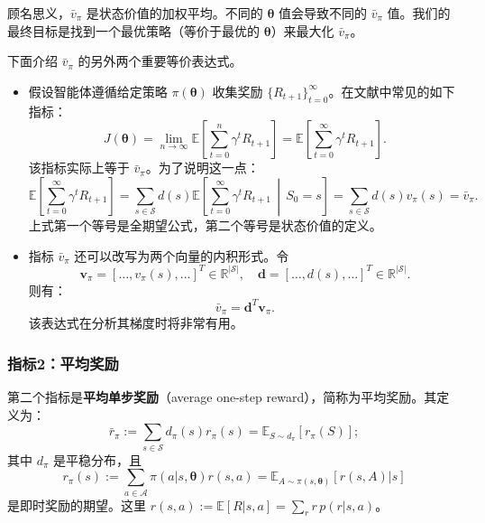 \documentclass[UTF8]{article}
\begin{document}
顾名思义，$\bar{v}_\pi$ 是状态价值的加权平均。不同的 $\boldsymbol{\theta}$ 值会导致不同的 $\bar{v}_\pi$ 值。我们的最终目标是找到一个最优策略（等价于最优的 $\boldsymbol{\theta}$）来最大化 $\bar{v}_\pi$。

下面介绍 $\bar{v}_\pi$ 的另外两个重要等价表达式。

\begin{itemize}
    \item 假设智能体遵循给定策略 $\pi(\boldsymbol{\theta})$ 收集奖励 $\{R_{t+1}\}_{t=0}^{\infty}$。在文献中常见的如下指标：
    \begin{equation}
    J(\boldsymbol{\theta}) = \lim_{n \to \infty} \mathbb{E}\left[ \sum_{t=0}^{n} \gamma^t R_{t+1} \right]
    = \mathbb{E}\left[ \sum_{t=0}^{\infty} \gamma^t R_{t+1} \right]. \label{eq:J_discounted}
    \end{equation}
    该指标实际上等于 $\bar{v}_\pi$。为了说明这一点：
    \[
    \mathbb{E}\left[ \sum_{t=0}^{\infty} \gamma^t R_{t+1} \right]
    = \sum_{s \in \mathcal{S}} d(s) \mathbb{E}\left[ \sum_{t=0}^{\infty} \gamma^t R_{t+1} \,\middle|\, S_0 = s \right]
    = \sum_{s \in \mathcal{S}} d(s) v_\pi(s) = \bar{v}_\pi.
    \]
    上式第一个等号是全期望公式，第二个等号是状态价值的定义。
    \item 指标 $\bar{v}_\pi$ 还可以改写为两个向量的内积形式。令
    \[
    \boldsymbol{v}_\pi = [\dots, v_\pi(s), \dots]^T \in \mathbb{R}^{|\mathcal{S}|}, \quad
    \boldsymbol{d} = [\dots, d(s), \dots]^T \in \mathbb{R}^{|\mathcal{S}|}.
    \]
    则有：
    \[
    \bar{v}_\pi = \boldsymbol{d}^T \boldsymbol{v}_\pi.
    \]
    该表达式在分析其梯度时将非常有用。
\end{itemize}

\subsubsection*{指标2：平均奖励}

第二个指标是\textbf{平均单步奖励}（average one-step reward），简称为平均奖励。其定义为：
\begin{equation}
\bar{r}_\pi := \sum_{s \in \mathcal{S}} d_\pi(s) r_\pi(s) = \mathbb{E}_{S \sim d_\pi}[r_\pi(S)]; \label{eq:avg_reward}
\end{equation}
其中 $d_\pi$ 是平稳分布，且
\begin{equation}
r_\pi(s) := \sum_{a \in \mathcal{A}} \pi(a|s, \boldsymbol{\theta}) r(s,a) = \mathbb{E}_{A \sim \pi(s,\boldsymbol{\theta})}[r(s,A) | s] \label{eq:r_pi}
\end{equation}
是即时奖励的期望。这里 $r(s,a) := \mathbb{E}[R|s,a] = \sum_{r} r \, p(r|s,a)$。
\end{document}
